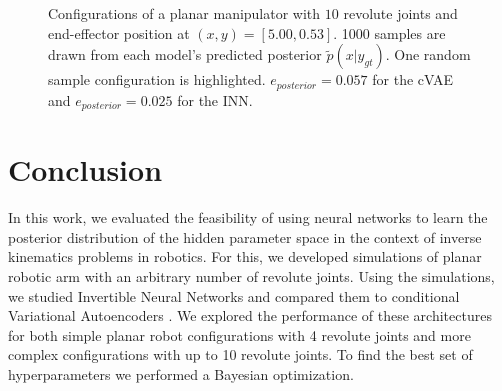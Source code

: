 \documentclass[conference]{IEEEtran}
\begin{document}
\begin{figure}[tbh]
\centering

    \caption{Configurations of a planar manipulator with $10$ revolute joints and end-effector position at $(x, y) = [5.00, 0.53]$. 1000 samples are drawn from each model's predicted posterior $\tilde{p}(x | y_{gt})$. One random sample configuration is highlighted. $e_{posterior} = 0.057$ for the cVAE and $e_{posterior} = 0.025$ for the INN.}
    \label{fig:posterior:10dof}
\end{figure}

\section*{Conclusion}

In this work, we evaluated the feasibility of using neural networks to learn the posterior distribution of the hidden parameter space in the context of inverse kinematics problems in robotics. For this, we developed simulations of planar robotic arm with an arbitrary number of revolute joints. Using the simulations, we studied Invertible Neural Networks \cite{Ardizzone2018} and compared them to conditional Variational Autoencoders \cite{Sohn2015}. We explored the performance of these architectures for both simple planar robot configurations with 4 revolute joints and more complex configurations with up to 10 revolute joints. To find the best set of hyperparameters we performed a Bayesian optimization.
\end{document}
